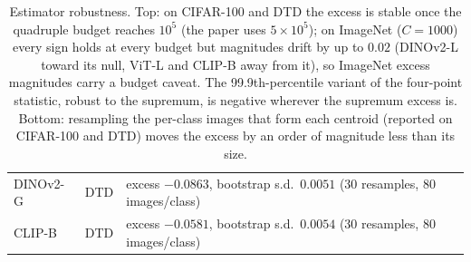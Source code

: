\begin{table}[H]
\begin{tabular}{llcccccc|c}
DINOv2-G & DTD & \multicolumn{6}{l}{excess $-0.0863$, bootstrap s.d.\ $0.0051$ (30 resamples, 80 images/class)} & \\
CLIP-B & DTD & \multicolumn{6}{l}{excess $-0.0581$, bootstrap s.d.\ $0.0054$ (30 resamples, 80 images/class)} & \\
\bottomrule
\end{tabular}
\caption{Estimator robustness. Top: on CIFAR-100 and DTD the excess is stable once the quadruple budget reaches $10^5$ (the paper uses $5{\times}10^5$); on ImageNet ($C{=}1000$) every sign holds at every budget but magnitudes drift by up to $0.02$ (DINOv2-L toward its null, ViT-L and CLIP-B away from it), so ImageNet excess magnitudes carry a budget caveat. The 99.9th-percentile variant of the four-point statistic, robust to the supremum, is negative wherever the supremum excess is. Bottom: resampling the per-class images that form each centroid (reported on CIFAR-100 and DTD) moves the excess by an order of magnitude less than its size.}
\label{tab:b15-robust}
\end{table}

